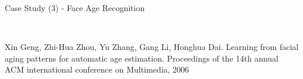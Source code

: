 \documentclass[
 size=14pt,
 paper=smartboard,  %
 mode=present, 		%
 display=slides, 	%
 pauseslide,
 fleqn,leqno]{powerdot}{}
\begin{document}
\begin{slide}{Case Study (3) - Face Age Recognition}

\begin{figure}[htbp]
    \\
\end{figure}

\begin{thebibliography}{}
\bibitem{}
\small{Xin Geng, Zhi-Hua Zhou, Yu Zhang, Gang Li, Honghua Dai.
Learning from facial aging patterns for automatic age estimation.
Proceedings of the 14th annual ACM international conference on Multimedia, 2006}
\end{thebibliography}

\end{slide}
\end{document}

